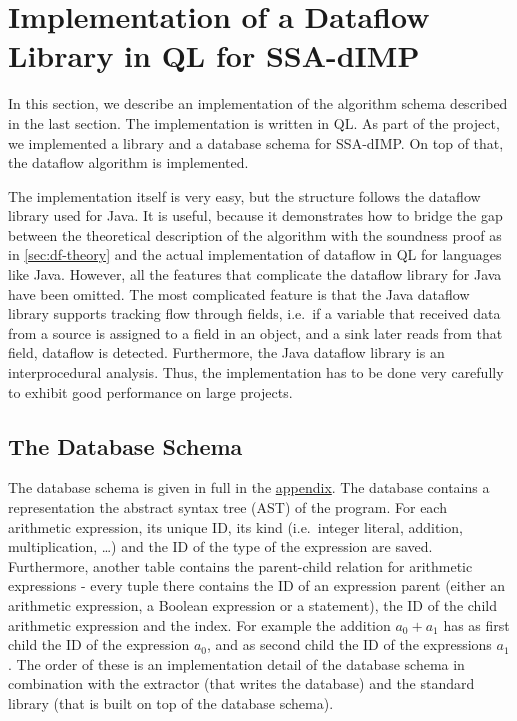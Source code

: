 \section{Implementation of a Dataflow Library in QL for SSA-dIMP}
In this section, we describe an implementation of the algorithm schema described in the
last section.
The implementation is written in QL.
As part of the project, we implemented a library and a database schema for SSA-dIMP.
On top of that, the dataflow algorithm is implemented.

The implementation itself is very easy, but the structure follows the
dataflow library used for Java.
It is useful, because it demonstrates how to bridge the gap between
the theoretical description of the algorithm with the soundness proof
as in \autoref{sec:df-theory} and the actual implementation of dataflow
in QL for languages like Java.
However, all the features that complicate the dataflow library for Java have been 
omitted.
The most complicated feature is that the Java dataflow library supports tracking 
flow through fields, i.e.\ if a variable that received data from a source 
is assigned to a field in an object, and a sink later reads from that field,
dataflow is detected.
Furthermore, the Java dataflow library is an interprocedural analysis.
Thus, the implementation has to be done very carefully to exhibit good
performance on large projects.

\subsection{The Database Schema}
The database schema is given in full in the \hyperref[lst:dbschema]{appendix}.
The database contains a representation the abstract syntax tree (AST) of the program.
For each arithmetic expression, its unique ID, its kind
(i.e.\ integer literal, addition, multiplication, \ldots) 
and the ID of the type of the expression are saved.
Furthermore, another table contains the parent-child relation for arithmetic 
expressions - every tuple there contains the ID of an expression parent 
(either an arithmetic expression, a Boolean expression or a statement),
the ID of the child arithmetic expression and the index.
For example the addition $a_0 + a_1$ has as first child the ID of the expression 
$a_0$, and as second child the ID of the expressions $a_1$.
The order of these is an implementation detail of the database schema in combination
with the extractor (that writes the database) and the standard library 
(that is built on top of the database schema).

